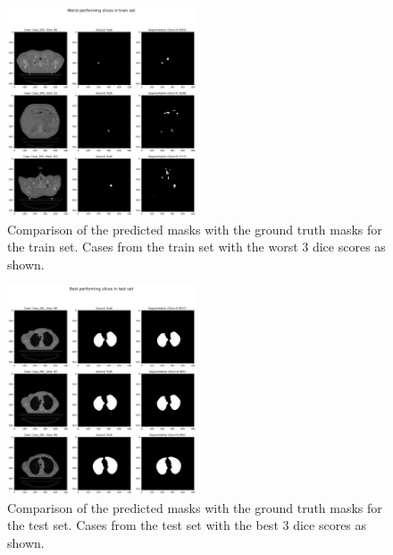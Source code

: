 \documentclass[11pt]{article}
\begin{document}
\begin{figure}[H]
    \centering
    \includegraphics[width=0.5\textwidth]{figs/Worst performing slices in train set.png}
    \caption{Comparison of the predicted masks with the ground truth masks for the train set. Cases from the train set with the worst 3 dice scores as shown.}
    \label{fig:worst_train_mask_comparison}
\end{figure}

\begin{figure}[H]
    \centering
    \includegraphics[width=0.5\textwidth]{figs/Best performing slices in test set.png}
    \caption{Comparison of the predicted masks with the ground truth masks for the test set. Cases from the test set with the best 3 dice scores as shown.}
    \label{fig:best_test_mask_comparison}
\end{figure}
\end{document}
